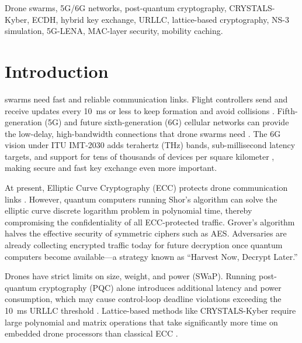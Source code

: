 \documentclass{ieeeaccess}
\begin{document}
\begin{IEEEkeywords}
Drone swarms, 5G/6G networks, post-quantum cryptography, CRYSTALS-Kyber, ECDH, hybrid key exchange, URLLC, lattice-based cryptography, NS-3 simulation, 5G-LENA, MAC-layer security, mobility caching.
\end{IEEEkeywords}

\maketitle

\section{Introduction}
\label{sec:introduction}

 swarms need fast and reliable communication links. Flight controllers send and receive updates every 10~ms or less to keep formation and avoid collisions \cite{ref29}. Fifth-generation (5G) and future sixth-generation (6G) cellular networks can provide the low-delay, high-bandwidth connections that drone swarms need \cite{ref16,ref17}. The 6G vision under ITU IMT-2030 adds terahertz (THz) bands, sub-millisecond latency targets, and support for tens of thousands of devices per square kilometer \cite{ref21}, making secure and fast key exchange even more important.

At present, Elliptic Curve Cryptography (ECC) protects drone communication links \cite{ref13}. However, quantum computers running Shor's algorithm \cite{ref9} can solve the elliptic curve discrete logarithm problem in polynomial time, thereby compromising the confidentiality of all ECC-protected traffic. Grover's algorithm \cite{ref10} halves the effective security of symmetric ciphers such as AES. Adversaries are already collecting encrypted traffic today for future decryption once quantum computers become available---a strategy known as ``Harvest Now, Decrypt Later.''

Drones have strict limits on size, weight, and power (SWaP). Running post-quantum cryptography (PQC) alone introduces additional latency and power consumption, which may cause control-loop deadline violations exceeding the 10~ms URLLC threshold \cite{ref29}. Lattice-based methods like CRYSTALS-Kyber require large polynomial and matrix operations that take significantly more time on embedded drone processors than classical ECC \cite{ref4}.
\end{document}
